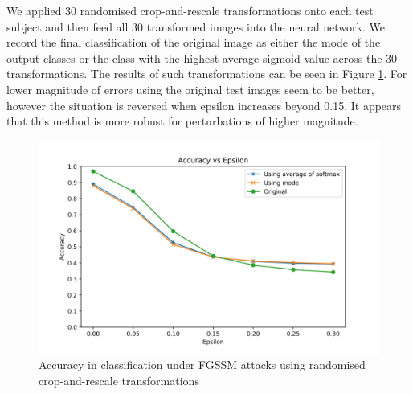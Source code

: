 We applied 30 randomised crop-and-rescale transformations onto each test subject and then feed all 30 transformed images into the neural network. We record the final classification of the original image as either the mode of the output classes or the class with the highest average sigmoid value across the 30 transformations. The results of such transformations can be seen in Figure \ref{fig:rand}. For lower magnitude of errors using the original test images seem to be better, however the situation is reversed when epsilon increases beyond 0.15. It appears that this method is more robust for perturbations of higher magnitude.

\begin{figure}[h!]
\includegraphics[width=\textwidth]{sgd_random}
		\caption{Accuracy in classification under FGSSM attacks using randomised crop-and-rescale transformations}
		\label{fig:rand}

\end{figure}